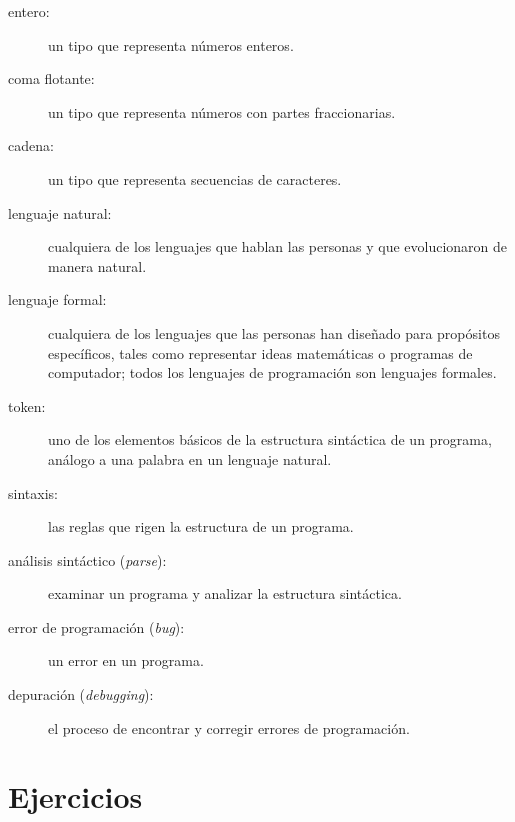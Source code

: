 \documentclass[10pt]{book}
\begin{document}
\begin{description}
\item[entero:] un tipo que representa números enteros.

\item[coma flotante:] un tipo que representa números con partes
fraccionarias.

\item[cadena:] un tipo que representa secuencias de caracteres.

\item[lenguaje natural:]  cualquiera de los lenguajes que hablan las personas y
que evolucionaron de manera natural.

\item[lenguaje formal:]  cualquiera de los lenguajes que las personas han diseñado
para propósitos específicos, tales como representar ideas matemáticas o
programas de computador; todos los lenguajes de programación son lenguajes formales.

\item[token:]  uno de los elementos básicos de la estructura sintáctica de
un programa, análogo a una palabra en un lenguaje natural.

\item[sintaxis:] las reglas que rigen la estructura de un programa.

\item[análisis sintáctico ({\em parse}):] examinar un programa y analizar la
estructura sintáctica.

\item[error de programación ({\em bug}):] un error en un programa.

\item[depuración ({\em debugging}):] el proceso de encontrar y corregir
errores de programación.

\end{description}


\section{Ejercicios}
\end{document}
